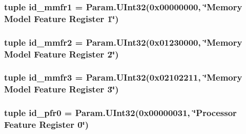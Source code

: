 \label{classArmISA_1_1ArmISA_a259cbe1f754166bd544c3abb11a0c192}
\hypertarget{classArmISA_1_1ArmISA_af523e23e8a95af113d87f846bd3ee2f3}{
\subsubsection[{id\_\-mmfr1}]{\setlength{\rightskip}{0pt plus 5cm}tuple {\bf id\_\-mmfr1} = Param.UInt32(0x00000000, \char`\"{}Memory Model Feature Register 1\char`\"{})}}
\label{classArmISA_1_1ArmISA_af523e23e8a95af113d87f846bd3ee2f3}
\hypertarget{classArmISA_1_1ArmISA_a22cf325de7eec913aa7572d0108a5676}{
\subsubsection[{id\_\-mmfr2}]{\setlength{\rightskip}{0pt plus 5cm}tuple {\bf id\_\-mmfr2} = Param.UInt32(0x01230000, \char`\"{}Memory Model Feature Register 2\char`\"{})}}
\label{classArmISA_1_1ArmISA_a22cf325de7eec913aa7572d0108a5676}
\hypertarget{classArmISA_1_1ArmISA_ac28ffe28e49db9d8b607d2c143f1b61b}{
\subsubsection[{id\_\-mmfr3}]{\setlength{\rightskip}{0pt plus 5cm}tuple {\bf id\_\-mmfr3} = Param.UInt32(0x02102211, \char`\"{}Memory Model Feature Register 3\char`\"{})}}
\label{classArmISA_1_1ArmISA_ac28ffe28e49db9d8b607d2c143f1b61b}
\hypertarget{classArmISA_1_1ArmISA_a248253e22ef8371f8e6f6ae8b2288818}{
\subsubsection[{id\_\-pfr0}]{\setlength{\rightskip}{0pt plus 5cm}tuple {\bf id\_\-pfr0} = Param.UInt32(0x00000031, \char`\"{}Processor Feature Register 0\char`\"{})}}
